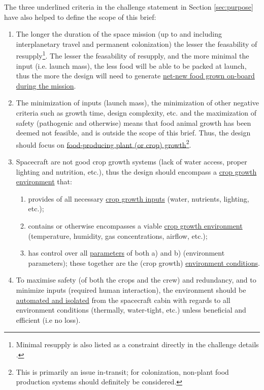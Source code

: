 \documentclass{report}
\begin{document}
The three underlined criteria in the challenge statement in Section \ref{sec:purpose} have also helped to define the scope of this brief:
\begin{enumerate}[label=SC\arabic*., ref=SC\arabic*]
\item \label{sc:1} The longer the duration of the space mission (up to and including interplanetary travel and permanent colonization) the lesser the feasability of
    resupply\footnote{Minimal resupply is also listed as a constraint directly in the challenge details \cite{applicantguide}.}.
    The lesser the feasability of resupply, and the more minimal the input (i.e. launch mass), the less food will be able to be packed at launch, thus the more the design will need to generate \uline{net-new food grown on-board during the mission}.
\item \label{sc:2} The minimization of inputs (launch mass), the minimization of other negative criteria such as growth time, design complexity, etc. and the maximization of safety (pathogenic and otherwise) means that food animal growth has been deemed not feasible, and is outside the scope of this brief. Thus, the design should focus on \uline{food-producing plant (or crop)
    growth}\footnote{This is primarily an issue in-transit; for colonization, non-plant food production systems should definitely be considered.}.
\item \label{sc:3} Spacecraft are not good crop growth systems (lack of water access, proper lighting and nutrition, etc.), thus the design should encompass a \uline{crop growth environment} that:
    \begin{enumerate}[label=SC3\alph*., ref=SC3\alph*]
        \item \label{sc:3a} provides of all necessary \uline{crop growth inputs} (water, nutrients, lighting, etc.);
        \item \label{sc:3b} contains or otherwise encompasses a viable \uline{crop growth environment} (temperature, humidity, gas concentrations, airflow, etc.);
        \item \label{sc:3c} has control over all \uline{parameters} of both a) and b) (environment parameters); these together are the (crop growth) \uline{environment conditions}.
    \end{enumerate}
\item \label{sc:4} To maximise safety (of both the crops and the crew) and redundancy, and to minimize inputs (required human interaction), the environment should be \uline{automated and isolated} from the spacecraft cabin with regards to all environment conditions (thermally, water-tight, etc.) unless beneficial and efficient (i.e no loss).

\end{enumerate}
\end{document}
